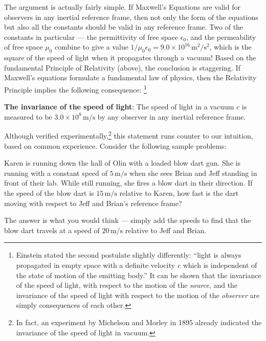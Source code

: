 The argument is actually fairly simple.  If Maxwell's Equations are
valid for observers in any inertial reference frame, then not only the
form of the equations but also all the constants should be valid in any
reference frame.  Two of the constants in particular --- the
permittivity of free space $\epsilon_0$, and the permeability of free
space $\mu_0$ combine to give a value $1/\mu_0\epsilon_0 = 9.0\times
10^{16}\,\text{m}^2 /\text{s}^2$, which is the square of the speed of
light when it propagates through a vacuum!  Based on the fundamental
Principle of Relativity (above), the conclusion is staggering.  If
Maxwell's equations formulate a fundamental law of physics, then the
Relativity Principle implies the following consequence:
\footnote{Einstein stated the second postulate slightly differently:  
``light is always propagated in empty space with a definite velocity
\emph{c} which is independent of the state of motion of the emitting
body.''  It can be shown that the invariance of the speed of light, 
with respect to the motion of the \emph{source}, and the invariance of the 
speed of light with respect to the motion of the \emph{observer}
are simply consequences of each other.}

\begin{lemma}
\textbf{The invariance of the speed of light}: The speed of light in a vacuum $c$
is measured to be $3.0\times 10^8\,\text{m/s}$ by any observer in any inertial
reference frame.
\end{lemma}
   
 Although verified experimentally,\footnote{In fact, an
  experiment by Michelson and Morley in 1895 already indicated the
  invariance of the speed of light in vacuum.} this statement runs
counter to our intuition, based on common experience.  Consider the
following sample problems:

\begin{example}
  Karen is running down the hall of Olin with a loaded blow dart gun.
  She is running with a constant speed of $5\,\text{m/s}$ when she sees Brian
  and Jeff standing in front of their lab. While still running, she
  fires a blow dart in their direction.  If the speed of the blow dart
  is $15\,\text{m/s}$ relative to Karen, how fast is the dart moving with
  respect to
  Jeff and Brian's reference frame?  

\solution The answer is what you
  would think --- simply add the speeds to find that the blow dart
  travels at a speed of $20\,\text{m/s}$ relative to Jeff and Brian.
\end{example}

